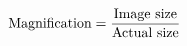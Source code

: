 \documentclass[preview]{standalone}
\begin{document}
\begin{align*}
\special{dvisvgm:raw <g id='unique000'>}\text{Magnification} = \frac{\text{Image size}}{\text{Actual size}}\special{dvisvgm:raw </g>}
\end{align*}
\end{document}
